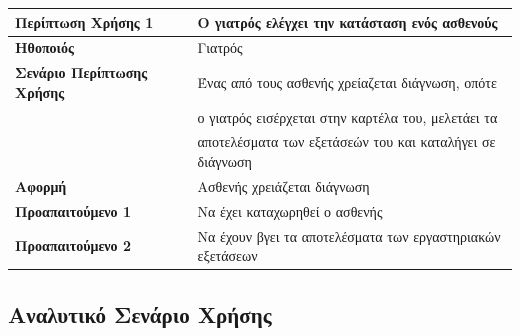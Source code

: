 \documentclass{article}
\newcommand\T{\rule{0pt}{2.6ex}}       %
\newcommand\B{\rule[-1.2ex]{0pt}{0pt}}
\begin{document}
\begin{center}
     \begin{tabular}{|l|l|}
     \hline
      \textbf{Περίπτωση Χρήσης 1 }   & Ο γιατρός ελέγχει την κατάσταση ενός ασθενούς \T\B \\ 
      \hline
      \textbf{Ηθοποιός} & Γιατρός \T\B \\
      \hline
      \textbf{Σενάριο Περίπτωσης Χρήσης} & Ένας από τους ασθενής χρείαζεται διάγνωση, οπότε\\& ο γιατρός εισέρχεται στην καρτέλα του, μελετάει τα\\& αποτελέσματα των εξετάσεών του και καταλήγει σε διάγνωση\T\B \\
      \hline
      \textbf{Αφορμή} & Ασθενής χρειάζεται διάγνωση \T\B \\
      \hline
      \textbf{Προαπαιτούμενο 1} & Να έχει καταχωρηθεί ο ασθενής \T\B \\
      \hline
      \textbf{Προαπαιτούμενο 2} & Να έχουν βγει τα αποτελέσματα των εργαστηριακών εξετάσεων \T\B \\
      \hline
     \end{tabular}
 \end{center}
 
 \subsection{Αναλυτικό Σενάριο Χρήσης}
 
\end{document}

